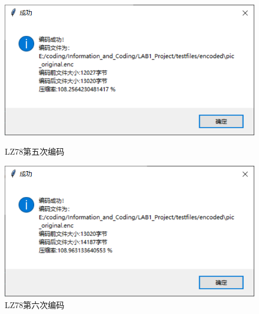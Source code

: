 \documentclass[12pt, a4paper]{ctexart}
\begin{document}
    \begin{figure}[H]
    \centering
    \begin{minipage}[t]{0.45\textwidth}
    \centering
    \includegraphics[width=\textwidth]{./pic/12-5.png}
    \caption{LZ78第五次编码}
    \end{minipage}
    \hfill
    \begin{minipage}[t]{0.45\textwidth}
    \centering
    \includegraphics[width=\textwidth]{./pic/12-6.png}
    \caption{LZ78第六次编码}
    \end{minipage}
    \end{figure}
\end{document}
